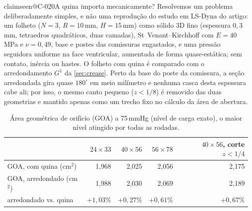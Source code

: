 \documentclass[11pt,a4paper]{article}
\makeatletter
\theoremstyle{plain}
\theoremstyle{remark}
\newcommand{\claim}[1]{\ifcsname claimseen@#1\endcsname\else\expandafter\gdef\csname claimseen@#1\endcsname{}\label{claim:#1}\fi}
\makeatother
\begin{document}
\claim{C-020}A quina importa mecanicamente? Resolvemos um problema deliberadamente simples, e não uma reprodução do estudo em
LS-Dyna do artigo: um folheto ($N=3$, $R=10$\,mm, $H=15$\,mm) como sólido 3D fino (espessura $0{,}3$\,mm, tetraedros
quadráticos, duas camadas), St~Venant--Kirchhoff com $E=40$\,MPa e $\nu=0{,}49$, base e postes das comissuras engastados, e
uma pressão seguidora uniforme na face ventricular, aumentada de forma quase-estática; sem contato, inércia ou hastes. O
folheto com quina é comparado com o arredondamento $G^1$ da \cref{sec:crease}. Perto da base do poste da comissura, a seção
arredondada gira quase $180^\circ$ em meio milímetro e nenhuma casca desta espessura cabe ali; por isso, o mesmo canto pequeno
($z<1/8$) é removido das duas geometrias e mantido apenas como um trecho fixo no cálculo da área de abertura.

\begin{table}[t]\centering\small
\begin{tabular}{lrrrr}\toprule
 & $24\times33$ & $40\times56$ & $56\times78$ & $40\times56$, corte $z<1/4$\\\midrule
GOA, com quina (cm$^2$) & 1,968 & 2,025 & 2,056 & 2,175\\
GOA, arredondado (cm$^2$) & 1,988 & 2,030 & 2,069 & 2,189\\
arredondado vs. quina & $+1{,}03\%$ & $+0{,}27\%$ & $+0{,}61\%$ & $+0{,}67\%$\\\bottomrule
\end{tabular}
\caption{Área geométrica de orifício (GOA) a 75\,mmHg (nível de carga exato), o maior nível atingido por todas as rodadas.}
\label{tab:fem}
\end{table}
\end{document}
